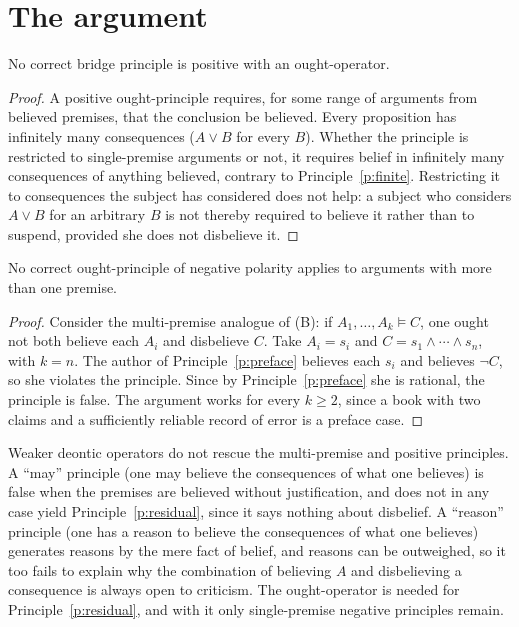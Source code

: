 \documentclass{situationist-preprint}
\begin{document}
\section{The argument}

\begin{lemma}\label{l:positive}
No correct bridge principle is positive with an ought-operator.
\end{lemma}

\begin{proof}
A positive ought-principle requires, for some range of arguments from believed premises, that the conclusion be believed. Every proposition has infinitely many consequences ($A \vee B$ for every $B$). Whether the principle is restricted to single-premise arguments or not, it requires belief in infinitely many consequences of anything believed, contrary to Principle~\ref{p:finite}. Restricting it to consequences the subject has considered does not help: a subject who considers $A \vee B$ for an arbitrary $B$ is not thereby required to believe it rather than to suspend, provided she does not disbelieve it.
\end{proof}

\begin{lemma}\label{l:multi}
No correct ought-principle of negative polarity applies to arguments with more than one premise.
\end{lemma}

\begin{proof}
Consider the multi-premise analogue of (B): if $A_1, \ldots, A_k \models C$, one ought not both believe each $A_i$ and disbelieve $C$. Take $A_i = s_i$ and $C = s_1 \wedge \cdots \wedge s_n$, with $k = n$. The author of Principle~\ref{p:preface} believes each $s_i$ and believes $\neg C$, so she violates the principle. Since by Principle~\ref{p:preface} she is rational, the principle is false. The argument works for every $k \geq 2$, since a book with two claims and a sufficiently reliable record of error is a preface case.
\end{proof}

Weaker deontic operators do not rescue the multi-premise and positive principles. A \enquote{may} principle (one may believe the consequences of what one believes) is false when the premises are believed without justification, and does not in any case yield Principle~\ref{p:residual}, since it says nothing about disbelief. A \enquote{reason} principle (one has a reason to believe the consequences of what one believes) generates reasons by the mere fact of belief, and reasons can be outweighed, so it too fails to explain why the combination of believing $A$ and disbelieving a consequence is always open to criticism. The ought-operator is needed for Principle~\ref{p:residual}, and with it only single-premise negative principles remain.
\end{document}

